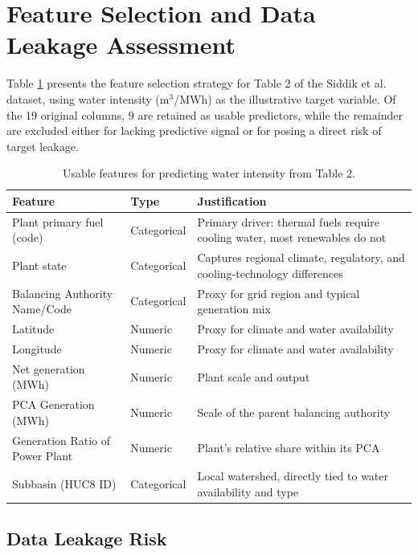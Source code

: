 \documentclass[conference]{IEEEtran}
\begin{document}
\section{Feature Selection and Data Leakage Assessment}

Table \ref{tab:features} presents the feature selection strategy for Table 2 of the Siddik et al. \cite{Siddik2021} dataset, using water intensity (m$^3$/MWh) as the illustrative target variable. Of the 19 original columns, 9 are retained as usable predictors, while the remainder are excluded either for lacking predictive signal or for posing a direct risk of target leakage.

\begin{table}[!ht]
\centering
\caption{Usable features for predicting water intensity from Table 2.}
\label{tab:features}
\footnotesize
\begin{tabularx}{\columnwidth}{@{}p{2.8cm}p{1.6cm}X@{}}
\toprule
\textbf{Feature} & \textbf{Type} & \textbf{Justification} \\
\midrule
Plant primary fuel (code) & Categorical & Primary driver: thermal fuels require cooling water, most renewables do not \\
\midrule
Plant state & Categorical & Captures regional climate, regulatory, and cooling-technology differences \\
\midrule
Balancing Authority Name/Code & Categorical & Proxy for grid region and typical generation mix \\
\midrule
Latitude & Numeric & Proxy for climate and water availability \\
\midrule
Longitude & Numeric & Proxy for climate and water availability \\
\midrule
Net generation (MWh) & Numeric & Plant scale and output \\
\midrule
PCA Generation (MWh) & Numeric & Scale of the parent balancing authority \\
\midrule
Generation Ratio of Power Plant & Numeric & Plant's relative share within its PCA \\
\midrule
Subbasin (HUC8 ID) & Categorical & Local watershed, directly tied to water availability and type \\
\bottomrule
\end{tabularx}
\end{table}

\subsection{Data Leakage Risk}
\end{document}
